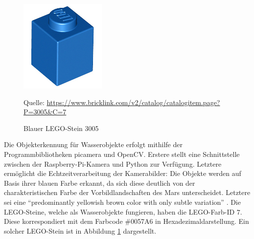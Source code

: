 \begin{figure}
	\centering
	\includegraphics[width=0.9\linewidth]{../Images/3005.png}
	\vspace{0.5em}
	\parbox[c]{0.8\linewidth}{\footnotesize
		\centering
		\vspace{1em}
		Quelle: \url{https://www.bricklink.com/v2/catalog/catalogitem.page?P=3005\&C=7}
	}
	\captionsetup{format=plain}
	\caption{Blauer LEGO-Stein 3005}
	\label{fig:lego3005}
\end{figure}

Die Objekterkennung für Wasserobjekte erfolgt mithilfe der Programmbibliotheken picamera und OpenCV.
Erstere stellt eine Schnittstelle zwischen der Raspberry-Pi-Kamera und Python zur Verfügung.
Letztere ermöglicht die Echtzeitverarbeitung der Kamerabilder:
Die Objekte werden auf Basis ihrer blauen Farbe erkannt, da sich diese deutlich von der charakteristischen Farbe der Vorbildlandschaften des Mars unterscheidet.
Letztere sei eine \enquote{predominantly yellowish brown color with only subtle variation} \cite{maki1999}.
Die LEGO-Steine, welche als Wasserobjekte fungieren, haben die LEGO-Farb-ID $7$.
Diese korrespondiert mit dem Farbcode \#0057A6 in Hexadezimaldarstellung.
Ein solcher LEGO-Stein ist in Abbildung \ref{fig:lego3005} dargestellt.

